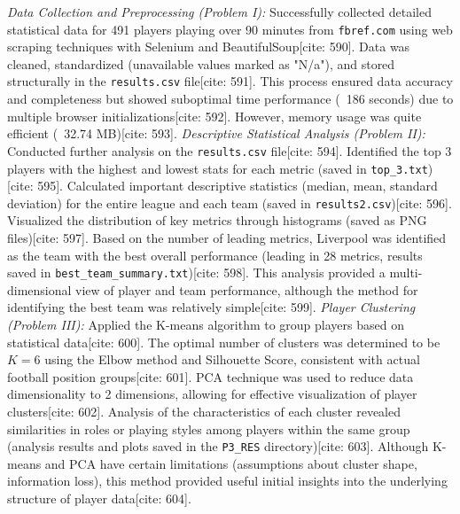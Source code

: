 \documentclass[12pt]{report}
\begin{document}
{{{{\vspace{0.5em}
\noindent
\textit{Data Collection and Preprocessing (Problem I):} Successfully collected detailed statistical data for 491 players playing over 90 minutes from \texttt{fbref.com} using web scraping techniques with Selenium and BeautifulSoup[cite: 590]. Data was cleaned, standardized (unavailable values marked as "N/a"), and stored structurally in the \texttt{results.csv} file[cite: 591]. This process ensured data accuracy and completeness but showed suboptimal time performance (~186 seconds) due to multiple browser initializations[cite: 592]. However, memory usage was quite efficient (~32.74 MB)[cite: 593].
\vspace{0.5em}
\noindent
\textit{Descriptive Statistical Analysis (Problem II):} Conducted further analysis on the \texttt{results.csv} file[cite: 594]. Identified the top 3 players with the highest and lowest stats for each metric (saved in \texttt{top\_3.txt})[cite: 595]. Calculated important descriptive statistics (median, mean, standard deviation) for the entire league and each team (saved in \texttt{results2.csv})[cite: 596]. Visualized the distribution of key metrics through histograms (saved as PNG files)[cite: 597]. Based on the number of leading metrics, Liverpool was identified as the team with the best overall performance (leading in 28 metrics, results saved in \texttt{best\_team\_summary.txt})[cite: 598]. This analysis provided a multi-dimensional view of player and team performance, although the method for identifying the best team was relatively simple[cite: 599].
\vspace{0.5em}
\noindent
\textit{Player Clustering (Problem III):} Applied the K-means algorithm to group players based on statistical data[cite: 600]. The optimal number of clusters was determined to be $K=6$ using the Elbow method and Silhouette Score, consistent with actual football position groups[cite: 601]. PCA technique was used to reduce data dimensionality to 2 dimensions, allowing for effective visualization of player clusters[cite: 602]. Analysis of the characteristics of each cluster revealed similarities in roles or playing styles among players within the same group (analysis results and plots saved in the \texttt{P3\_RES} directory)[cite: 603]. Although K-means and PCA have certain limitations (assumptions about cluster shape, information loss), this method provided useful initial insights into the underlying structure of player data[cite: 604].
\vspace{0.5em}
\noindent
}}}}
\end{document}
